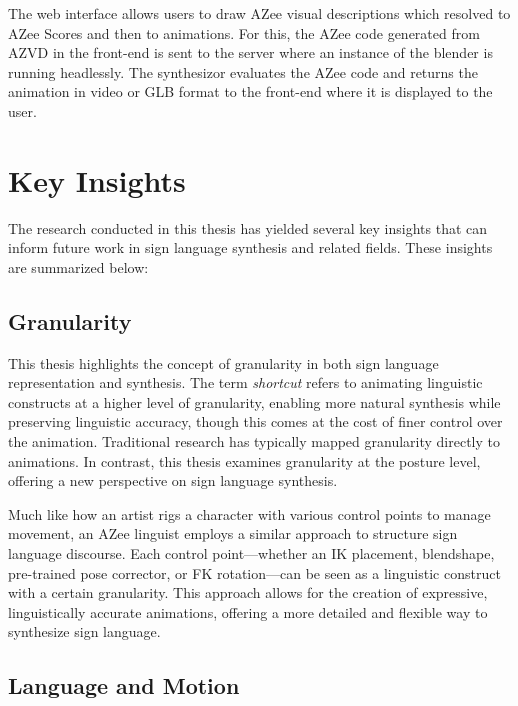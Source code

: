 \documentclass[../../main.tex]{subfiles}
\begin{document}
The web interface allows users to draw AZee visual descriptions which resolved to AZee Scores and then to animations. For this, the AZee code generated from AZVD in the front-end is sent to the server where an instance of the blender is running headlessly. The synthesizor evaluates the AZee code and returns the animation in video or GLB format to the front-end where it is displayed to the user.

\section{Key Insights}
\label{ch:conclusion:key_insights}

The research conducted in this thesis has yielded several key insights that can inform future work in sign language synthesis and related fields. These insights are summarized below:

\subsection{Granularity}
\label{ch:conclusion:key_insights:granularity}

This thesis highlights the concept of granularity in both sign language representation and synthesis. The term \emph{shortcut} refers to animating linguistic constructs at a higher level of granularity, enabling more natural synthesis while preserving linguistic accuracy, though this comes at the cost of finer control over the animation. Traditional research has typically mapped granularity directly to animations. In contrast, this thesis examines granularity at the posture level, offering a new perspective on sign language synthesis.

Much like how an artist rigs a character with various control points to manage movement, an AZee linguist employs a similar approach to structure sign language discourse. Each control point—whether an IK placement, blendshape, pre-trained pose corrector, or FK rotation—can be seen as a linguistic construct with a certain granularity. This approach allows for the creation of expressive, linguistically accurate animations, offering a more detailed and flexible way to synthesize sign language.

\subsection{Language and Motion}
\label{ch:conclusion:key_insights:language_motion}
\end{document}
